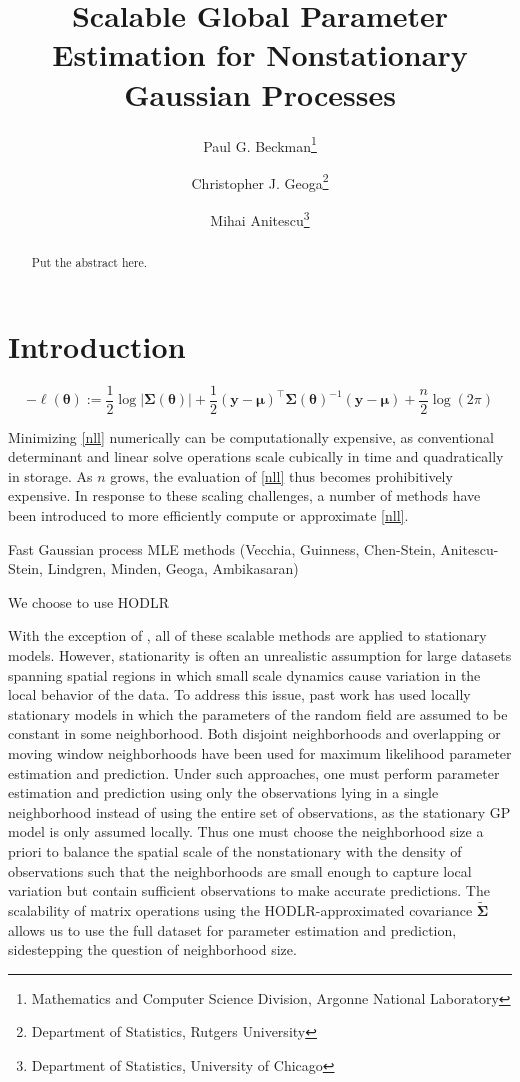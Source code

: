 \documentclass{article}
\title{\textbf{Scalable Global Parameter Estimation for Nonstationary Gaussian Processes}}
\date{}
\author{
Paul G. Beckman\thanks{Mathematics and Computer Science Division, Argonne National Laboratory} \and
Christopher J. Geoga\footnotemark[1] \thanks{Department of Statistics, Rutgers University} \and
Mihai Anitescu\footnotemark[1] \thanks{Department of Statistics, University of Chicago}
}
\newcommand{\abs}[1]{\left|#1\right|}
\numberwithin{equation}{section}
\begin{document}
\maketitle

\vspace{-2\baselineskip}

\begin{abstract}
Put the abstract here.
\end{abstract}

\section{Introduction}

\begin{equation}
  -\ell(\bm{\theta}) := \frac{1}{2}\log\abs{\bm{\Sigma}(\bm{\theta})} + \frac{1}{2}(\mathbf{y}-\bm{\mu})^\top\bm{\Sigma}(\bm{\theta})^{-1}(\mathbf{y}-\bm{\mu}) + \frac{n}{2}\log(2\pi)
  \label{nll}
\end{equation}

Minimizing \ref{nll} numerically can be computationally expensive, as conventional determinant and linear solve operations scale cubically in time and quadratically in storage. As $n$ grows, the evaluation of \ref{nll} thus becomes prohibitively expensive. In response to these scaling challenges, a number of methods have been introduced to more efficiently compute or approximate \ref{nll}.

Fast Gaussian process MLE methods (Vecchia, Guinness, Chen-Stein, Anitescu-Stein, Lindgren, Minden, Geoga, Ambikasaran)

We choose to use HODLR

With the exception of \cite{guinness2019gaussian}, all of these scalable methods are applied to stationary models. However, stationarity is often an unrealistic assumption for large datasets spanning spatial regions in which small scale dynamics cause variation in the local behavior of the data. To address this issue, past work has used locally stationary models in which the parameters of the random field are assumed to be constant in some neighborhood. Both disjoint neighborhoods \cite{lenzi2019improving} and overlapping or moving window neighborhoods \cite{kuusela2018locally, anderes2011local} have been used for maximum likelihood parameter estimation and prediction. Under such approaches, one must perform parameter estimation and prediction using only the observations lying in a single neighborhood instead of using the entire set of observations, as the stationary GP model is only assumed locally. Thus one must choose the neighborhood size a priori to balance the spatial scale of the nonstationary with the density of observations such that the neighborhoods are small enough to capture local variation but contain sufficient observations to make accurate predictions. The scalability of matrix operations using the HODLR-approximated covariance $\bm{\tilde{\Sigma}}$ allows us to use the full dataset for parameter estimation and prediction, sidestepping the question of neighborhood size.
\end{document}
